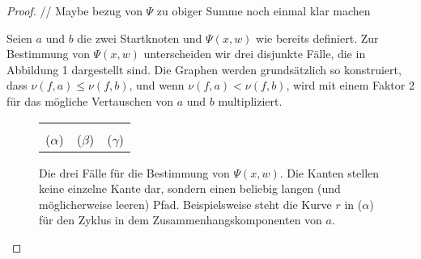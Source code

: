 \documentclass[a4paper, 10pt, ngerman]{article}
\begin{document}
\begin{proof}
    // Maybe bezug von $\Psi$ zu obiger Summe noch einmal klar machen


    Seien $a$ und $b$ die zwei Startknoten und $\Psi(x, w)$ wie bereits definiert. Zur Bestimmung von $\Psi(x, w)$ unterscheiden wir drei disjunkte Fälle, die in Abbildung 1 dargestellt sind. Die Graphen werden grundsätzlich so konstruiert, dass $\nu(f, a) \le \nu(f, b)$, und wenn $\nu(f, a) < \nu(f, b)$, wird mit einem Faktor 2 für das mögliche Vertauschen von $a$ und $b$ multipliziert.

    \begin{figure}
        \begin{tabular}{ccc}
             &  &  \\
            ($\alpha$)                           & ($\beta$)                           & ($\gamma$)
        \end{tabular}
        \caption{Die drei Fälle für die Bestimmung von $\Psi(x, w)$. Die Kanten stellen keine einzelne Kante dar, sondern einen beliebig langen (und möglicherweise leeren) Pfad. Beispielsweise steht die Kurve $r$ in ($\alpha$) für den Zyklus in dem Zusammenhangskomponenten von $a$.}
    \end{figure}


\end{proof}
\end{document}
